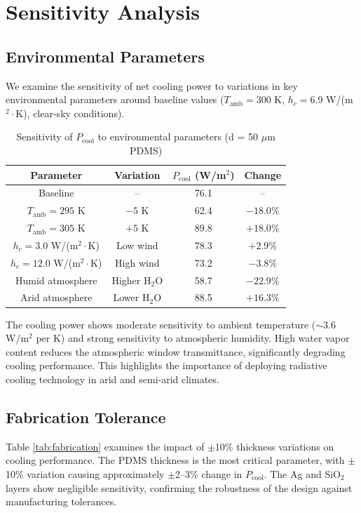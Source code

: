 \section{Sensitivity Analysis}

\subsection{Environmental Parameters}

We examine the sensitivity of net cooling power to variations in key environmental parameters around baseline values ($T_{\text{amb}} = 300$ K, $h_c = 6.9$ W/(m$^2\cdot$K), clear-sky conditions).

\begin{table}[htbp]
  \centering
  \caption{Sensitivity of $P_{\text{cool}}$ to environmental parameters (d = 50 $\mu$m PDMS)}
  \begin{tabular}{c|c|c|c}
    \toprule
    \textbf{Parameter} & \textbf{Variation} & $P_{\text{cool}}$ (W/m$^2$) & \textbf{Change} \\
    \midrule
    Baseline & -- & 76.1 & -- \\
    $T_{\text{amb}} = 295$ K & $-5$ K & 62.4 & $-18.0\%$ \\
    $T_{\text{amb}} = 305$ K & $+5$ K & 89.8 & $+18.0\%$ \\
    $h_c = 3.0$ W/(m$^2\cdot$K) & Low wind & 78.3 & $+2.9\%$ \\
    $h_c = 12.0$ W/(m$^2\cdot$K) & High wind & 73.2 & $-3.8\%$ \\
    Humid atmosphere & Higher H$_2$O & 58.7 & $-22.9\%$ \\
    Arid atmosphere & Lower H$_2$O & 88.5 & $+16.3\%$ \\
    \bottomrule
  \end{tabular}
\end{table}

The cooling power shows moderate sensitivity to ambient temperature ($\sim$3.6 W/m$^2$ per K) and strong sensitivity to atmospheric humidity. High water vapor content reduces the atmospheric window transmittance, significantly degrading cooling performance. This highlights the importance of deploying radiative cooling technology in arid and semi-arid climates.

\subsection{Fabrication Tolerance}

Table \ref{tab:fabrication} examines the impact of $\pm$10\% thickness variations on cooling performance. The PDMS thickness is the most critical parameter, with $\pm$10\% variation causing approximately $\pm$2--3\% change in $P_{\text{cool}}$. The Ag and SiO$_2$ layers show negligible sensitivity, confirming the robustness of the design against manufacturing tolerances.


